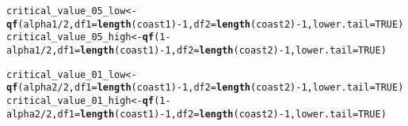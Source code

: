 \documentclass{article}\usepackage[]{graphicx}\usepackage[]{xcolor}
\makeatletter
\newcommand{\hlnum}[1]{\textcolor[rgb]{0.686,0.059,0.569}{#1}}%
\newcommand{\hlopt}[1]{\textcolor[rgb]{0,0,0}{#1}}%
\newcommand{\hldef}[1]{\textcolor[rgb]{0.345,0.345,0.345}{#1}}%
\newcommand{\hlkwb}[1]{\textcolor[rgb]{0.69,0.353,0.396}{#1}}%
\newcommand{\hlkwc}[1]{\textcolor[rgb]{0.333,0.667,0.333}{#1}}%
\newcommand{\hlkwd}[1]{\textcolor[rgb]{0.737,0.353,0.396}{\textbf{#1}}}%
\newenvironment{kframe}{%
 \def\at@end@of@kframe{}%
 \ifinner\ifhmode%
  \def\at@end@of@kframe{\end{minipage}}%
  \begin{minipage}{\columnwidth}%
 \fi\fi%
 \def\FrameCommand##1{\hskip\@totalleftmargin \hskip-\fboxsep
 \colorbox{shadecolor}{##1}\hskip-\fboxsep
     \hskip-\linewidth \hskip-\@totalleftmargin \hskip\columnwidth}%
 \MakeFramed {\advance\hsize-\width
   \@totalleftmargin\z@ \linewidth\hsize
   \@setminipage}}%
 {\par\unskip\endMakeFramed%
 \at@end@of@kframe}
\newenvironment{knitrout}{}{} %
\makeatother
\begin{document}
\begin{knitrout}
\begin{kframe}
\begin{alltt}
\hldef{critical_value_05_low} \hlkwb{<-} \hlkwd{qf}\hldef{(alpha1} \hlopt{/} \hlnum{2}\hldef{,} \hlkwc{df1} \hldef{=} \hlkwd{length}\hldef{(coast1)} \hlopt{-} \hlnum{1}\hldef{,} \hlkwc{df2} \hldef{=} \hlkwd{length}\hldef{(coast2)} \hlopt{-} \hlnum{1}\hldef{,} \hlkwc{lower.tail} \hldef{=} \hlnum{TRUE}\hldef{)}
\hldef{critical_value_05_high} \hlkwb{<-} \hlkwd{qf}\hldef{(}\hlnum{1} \hlopt{-} \hldef{alpha1} \hlopt{/} \hlnum{2}\hldef{,} \hlkwc{df1} \hldef{=} \hlkwd{length}\hldef{(coast1)} \hlopt{-} \hlnum{1}\hldef{,} \hlkwc{df2} \hldef{=} \hlkwd{length}\hldef{(coast2)} \hlopt{-} \hlnum{1}\hldef{,} \hlkwc{lower.tail} \hldef{=} \hlnum{TRUE}\hldef{)}

\hldef{critical_value_01_low} \hlkwb{<-} \hlkwd{qf}\hldef{(alpha2} \hlopt{/} \hlnum{2}\hldef{,} \hlkwc{df1} \hldef{=} \hlkwd{length}\hldef{(coast1)} \hlopt{-} \hlnum{1}\hldef{,} \hlkwc{df2} \hldef{=} \hlkwd{length}\hldef{(coast2)} \hlopt{-} \hlnum{1}\hldef{,} \hlkwc{lower.tail} \hldef{=} \hlnum{TRUE}\hldef{)}
\hldef{critical_value_01_high} \hlkwb{<-} \hlkwd{qf}\hldef{(}\hlnum{1} \hlopt{-} \hldef{alpha2} \hlopt{/} \hlnum{2}\hldef{,} \hlkwc{df1} \hldef{=} \hlkwd{length}\hldef{(coast1)} \hlopt{-} \hlnum{1}\hldef{,} \hlkwc{df2} \hldef{=} \hlkwd{length}\hldef{(coast2)} \hlopt{-} \hlnum{1}\hldef{,} \hlkwc{lower.tail} \hldef{=} \hlnum{TRUE}\hldef{)}


\end{alltt}
\end{kframe}
\end{knitrout}
\end{document}
